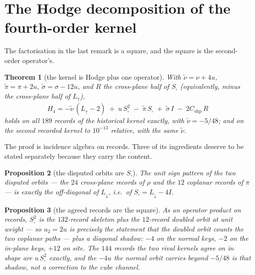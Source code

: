 \documentclass[11pt]{article}
\newtheorem{theorem}{Theorem}[section]
\newtheorem{proposition}[theorem]{Proposition}
\theoremstyle{definition}
\theoremstyle{remark}
\newcommand{\Ldn}{L_{\downarrow}}
\newcommand{\Lup}{L_{\uparrow}}
\newcommand{\Ssq}{S_{\square}}
\newcommand{\chk}[1]{}
\begin{document}
\section{The Hodge decomposition of the fourth-order kernel}\label{sec:hodge}

The factorisation in the last remark is a square, and the square is the second-order
operator's.

\begin{theorem}[the kernel is Hodge plus one operator]\label{thm:hodge}
With $\tilde\nu=\nu+4u$, $\tilde\pi=\pi+2u$, $\tilde\sigma=\sigma-12u$, and $R$
the cross-plane half of $\Ssq$ (equivalently, minus the cross-plane half of
$\Lup$),
\begin{equation}\label{eq:hodge}
  H_4=-\tilde\nu\,(\Lup-2)\;+\;u\,\Ssq^2\;-\;\tilde\pi\,\Ssq\;+\;\tilde\sigma\,I
      \;-\;2C_{\mathrm{shp}}\,R
\end{equation}
holds on all $189$ records of the historical kernel exactly, with
$\tilde\nu=-5/48$; and on the second recorded kernel to $10^{-13}$ relative,
with the same $\tilde\nu$.\chk{H4 = -nu~(L\_up - 2) + u S\_sq\^{}2 - pi~ S\_sq + sigma~ - 2 C\_shp R exactly: C\_shp is the coefficient of the one non-Hodge operator}
\end{theorem}

The proof is incidence algebra on records. Three of its ingredients deserve to
be stated separately because they carry the content.

\begin{proposition}[the disputed orbits are $\Ssq$]\label{prop:signs}
The unit sign pattern of the two disputed orbits --- the $24$ cross-plane
records of $\rho$ and the $12$ coplanar records of $\pi$ --- is exactly the
off-diagonal of $\Ldn$, i.e.\ of $\Ssq=\Ldn-4I$.\chk{no plane-basis convention flips rho or pi: only +-1 keeps the 144 agreed records}
\end{proposition}

\begin{proposition}[the agreed records are the square]\label{prop:square}
As an operator product on records, $\Ssq^2$ is the $132$-record skeleton plus
the $12$-record doubled orbit at unit weight --- so $u_2=2u$ is precisely the
statement that the doubled orbit counts the two coplanar paths --- plus a
diagonal shadow: $-4$ on the normal keys, $-2$ on the in-plane keys, $+12$ on
site. The $144$ records the two rival kernels agree on in shape are $u\,\Ssq^2$
exactly, and the $-4u$ the normal orbit carries beyond $-5/48$ is that shadow,
not a correction to the cube channel.\chk{the 144 agreed records are u S\_sq\^{}2, the shared-link adjacency squared}
\end{proposition}
\end{document}
